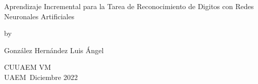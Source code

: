 \begin{titlepage}
    \begin{center}
    \vspace*{1.0in}
    {\LARGE Aprendizaje Incremental para la Tarea de Reconocimiento de Digitos con Redes Neuronales Artificiales}
    \par
    \vspace{0.5in}
    {by}
    \par
    \vspace{0.2in}
    {\large Gonz\'alez Hern\'andez Luis \'Angel}
    \par					%
    \vspace{2in}
    
    \par
    \vspace{2in}
    \begin{flushright}
     
    
    CUUAEM VM \\
    UAEM\
    Diciembre 2022
    
    \end{flushright}
    
    \end{center}
\end{titlepage}